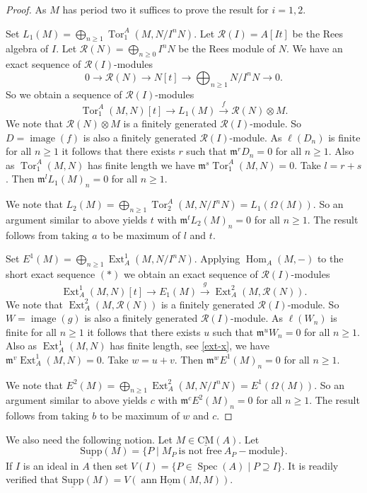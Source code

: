 \documentclass{amsart}
\newcommand{\m}{\mathfrak{m} }
\newcommand{\R}{\mathcal{R} }
\newcommand{\rt}{\rightarrow}
\newcommand{\image}{\operatorname{image}}
\newcommand{\Tor}{\operatorname{Tor}}
\newcommand{\ann}{\operatorname{ann}}
\newcommand{\Supp}{\operatorname{\underline{Supp}}}
\newcommand{\Spec}{\operatorname{Spec}}
\newcommand{\CMS}{\operatorname{\underline{CM}}}
\newcommand{\Hom}{\operatorname{Hom}}
\newcommand{\sHom}{\operatorname{\underline{Hom}}}
\newcommand{\Ext}{\operatorname{Ext}}
\theoremstyle{plain}
\theoremstyle{definition}
\theoremstyle{remark}
\begin{document}
\begin{proof}
As $M$ has period two it suffices to prove the result for $i = 1, 2$.

 Set $L_1(M) = \bigoplus_{n \geq 1}\Tor^A_1(M, N/I^{n}N)$. Let $\R(I) = A[It]$ be the Rees algebra of $I$.
Let $\R(N) = \bigoplus_{n \geq 0}I^nN$ be the Rees module of $N$. We have an exact sequence of $\R(I)$-modules
\begin{equation*}
 0 \rt \R(N) \rt N[t] \rt \bigoplus_{n \geq 1}N/I^nN \rt 0. \tag{*}
\end{equation*}
So we obtain a sequence of $\R(I)$-modules
\[
\Tor^A_1(M, N)[t] \rt L_1(M) \xrightarrow{f} \R(N)\otimes M.
\]
We note that $\R(N)\otimes M$ is a finitely generated $\R(I)$-module. So $D = \image(f)$ is also a finitely generated $\R(I)$-module. As $\ell(D_n)$ is finite for all $n \geq 1$ it follows that
there exists $r$ such that $\m^rD_n = 0$ for all $n \geq 1$. Also as $\Tor^A_1(M, N)$ has finite length we have $\m^s\Tor^A_1(M, N) = 0$. Take $l = r + s$. Then $\m^lL_1(M)_n = 0$ for all $n \geq 1$.

We note that $L_2(M) = \bigoplus_{n \geq 1}\Tor^A_2(M, N/I^{n}N) = L_1(\Omega(M))$. So an argument similar to above yields $t$ with $\m^tL_2(M)_n = 0$ for all $n \geq 1$. The result follows from taking $a$ to be maximum of $l$ and $t$.

Set $E^1(M) = \bigoplus_{n \geq 1}\Ext_A^1(M, N/I^{n}N)$. Applying $\Hom_A(M, -)$ to the short exact sequence $(*)$ we obtain an exact sequence of $\R(I)$-modules
\[
\Ext^1_A(M, N)[t] \rt E_1(M) \xrightarrow{g} \Ext^2_A(M, \R(N)).
\]
We note that  $\Ext^2_A(M, \R(N))$ is a finitely generated $\R(I)$-module. So $W = \image(g)$ is also a finitely generated $\R(I)$-module. As $\ell(W_n)$ is finite for all $n \geq 1$ it follows that
there exists $u$ such that $\m^uW_n = 0$ for all $n \geq 1$. Also as $\Ext^1_A(M, N)$ has finite length, see \ref{ext-x}, we have $\m^v\Ext_A^1(M, N) = 0$. Take $w = u + v$. Then $\m^wE^1(M)_n = 0$ for all $n \geq 1$.

We note that $E^2(M) = \bigoplus_{n \geq 1}\Ext^2_A(M, N/I^{n}N) = E^1(\Omega(M))$. So an argument similar to above yields $c$ with $\m^cE^2(M)_n = 0$ for all $n \geq 1$. The result follows from taking $b$ to be maximum of $w$ and $c$.
\end{proof}
\s We also need the following notion. Let $M \in \CMS(A)$. Let
\[
\Supp(M) = \{ P \mid  M_P \ \text{is not free} \ A_P-\text{module} \}.
\]
If $I$ is an ideal in $A$ then set $V(I) = \{ P \in \Spec(A) \mid P \supseteq I \}$.
It is readily verified that $\Supp(M) = V(\ann \sHom(M, M))$.
\end{document}
